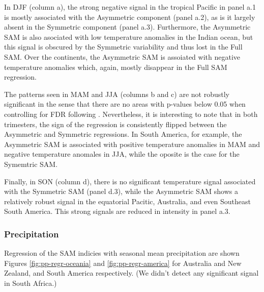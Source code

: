 \documentclass[]{ametsocV5}
\begin{document}
In DJF (column a), the strong negative signal in the tropical Pacific in
panel a.1 is mostly associated with the Asymmetric component (panel
a.2), as is it largely absent in the Symmetric component (panel a.3).
Furthermore, the Asymmetric SAM is also asociated with low temperature
anomalies in the Indian ocean, but this signal is obscured by the
Symmetric variability and thus lost in the Full SAM. Over the
continents, the Asymmetric SAM is assoiated with negative temperature
anomalies which, again, mostly disappear in the Full SAM regression.

The patterns seen in MAM and JJA (columns b and c) are not robustly
significant in the sense that there are no areas with p-values below
0.05 when controlling for FDR following \citet{wilks2016}. Nevertheless,
it is interesting to note that in both trimesters, the sign of the
regression is consistently flipped between the Asymmetric and Symmetric
regressions. In South America, for example, the Asymmetric SAM is
associated with positive temperature anomalies in MAM and negative
temperature anomales in JJA, while the oposite is the case for the
Symemtric SAM.

Finally, in SON (column d), there is no significant temperature signal
associated with the Symmetric SAM (panel d.3), while the Asymmetric SAM
shows a relatively robust signal in the equatorial Pacitic, Australia,
and even Southeast South America. This strong signals are reduced in
intensity in panel a.3.

\subsubsection{Precipitation}

Regression of the SAM indicies with seasonal mean precipitation are
shown Figures \ref{fig:pp-regr-oceania} and \ref{fig:pp-regr-america}
for Australia and New Zealand, and South America respectively. (We
didn't detect any significant signal in South Africa.)
\end{document}
